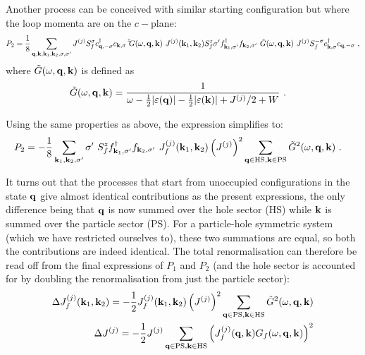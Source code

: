 \documentclass[%
reprint,
superscriptaddress,
groupedaddress,
superscriptaddress,
onecolumn,
10pt
]{revtex4-2}
\begin{document}
Another process can be conceived with similar starting configuration but where the loop momenta are on the \(c-\)plane:
\begin{equation}\begin{aligned}
	P_2 = \frac{1}{8}\sum_{{\bf q},{\bf k},{\bf k}_1, {\bf k}_2,\sigma,\sigma^\prime} J^{(j)} S_f^\sigma c^\dagger_{{\bf q},-\sigma}c_{{\bf k},\sigma} ~ \tilde \tilde G(\omega, {\bf q}, {\bf k}) ~ J^{(j)}({\bf k}_1,{\bf k}_2) S_f^z \sigma^\prime f^\dagger_{{\bf k}_1,\sigma^\prime}f_{{\bf k}_2,\sigma^\prime} ~ \tilde G(\omega, {\bf q}, {\bf k}) ~ J^{(j)} S_f^{-\sigma} c^\dagger_{{\bf k},\sigma}c_{{\bf q},-\sigma}~,
\end{aligned}\end{equation}
where \(\tilde G(\omega,{\bf q}, {\bf k})\) is defined as
\begin{equation}\begin{aligned}
	\tilde G(\omega,{\bf q}, {\bf k}) &= \frac{1}{\omega - \frac{1}{2}|\varepsilon({\bf q})| - \frac{1}{2}|\varepsilon({\bf k})| + J^{(j)}/2 + W}~.
\end{aligned}\end{equation}


Using the same properties as above, the expression simplifies to:
\begin{equation}\begin{aligned}
	P_2 &= -\frac{1}{8}\sum_{{\bf k}_1, {\bf k}_2,\sigma^\prime} \sigma^\prime~S_f^z f^\dagger_{{\bf k}_1,\sigma^\prime}f_{{\bf k}_2,\sigma^\prime} ~  J_f^{(j)}({\bf k}_1,{\bf k}_2) \left(J^{(j)}\right)^2 \sum_{{\bf q} \in \text{HS} ,{\bf k} \in \text{PS}}\tilde G^2(\omega,{\bf q}, {\bf k})~.
\end{aligned}\end{equation}

It turns out that the processes that start from unoccupied configurations in the state \({\bf q}\) give almost identical contributions as the present expressions, the only difference being that \({\bf q}\) is now summed over the hole sector (HS) while \({\bf k}\) is summed over the particle sector (PS). For a particle-hole symmetric system (which we have restricted ourselves to), these two summations are equal, so both the contributions are indeed identical. The total renormalisation can therefore be read off from the final expressions of \(P_1\) and \(P_2\) (and the hole sector is accounted for by doubling the renormalisation from just the particle sector):
\begin{equation}\begin{aligned}
	\Delta J_f^{(j)}({\bf k}_1,{\bf k}_2) = -\frac{1}{2}J_f^{(j)}({\bf k}_1,{\bf k}_2) \left(J^{(j)}\right)^2 \sum_{{\bf q} \in \text{PS} ,{\bf k} \in \text{HS}}\tilde G^2(\omega, {\bf q}, {\bf k})\\
	\Delta J^{(j)} = -\frac{1}{2}J^{(j)} \sum_{{\bf q} \in \text{PS} ,{\bf k} \in \text{HS}}\left(J_f^{(j)}({\bf q},{\bf k}) G_f(\omega, {\bf q}, {\bf k})\right)^2\\
\end{aligned}\end{equation}
\end{document}
